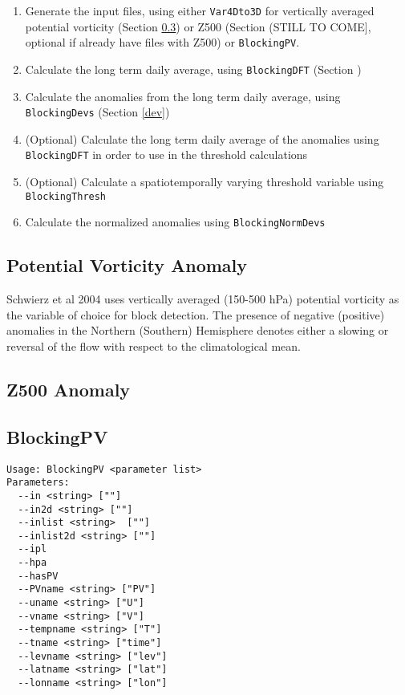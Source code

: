 \documentclass{article}
\begin{document}
\begin{enumerate}
\item Generate the input files, using either \texttt{Var4Dto3D} for vertically averaged potential vorticity (Section \ref{PV}) or Z500 (Section (STILL TO COME], optional if already have files with Z500) or \texttt{BlockingPV}.
\item Calculate the long term daily average, using \texttt{BlockingDFT} (Section )
\item Calculate the anomalies from the long term daily average, using \texttt{BlockingDevs} (Section \ref{dev})
\item (Optional) Calculate the long term daily average of the anomalies using \texttt{BlockingDFT} in order to use in the threshold calculations
\item (Optional) Calculate a spatiotemporally varying threshold variable using \texttt{BlockingThresh}
\item Calculate the normalized anomalies using \texttt{BlockingNormDevs}
\end{enumerate}

\subsection{Potential Vorticity Anomaly}

Schwierz et al 2004 uses vertically averaged (150-500 hPa) potential vorticity as the variable of choice for block detection. The presence of negative (positive) anomalies in the Northern (Southern) Hemisphere denotes either a slowing or reversal of the flow with respect to the climatological mean. 

\subsection{Z500 Anomaly}

\subsection{BlockingPV}\label{PV}
\begin{verbatim}
Usage: BlockingPV <parameter list>
Parameters:
  --in <string> [""]
  --in2d <string> [""]
  --inlist <string>  [""]
  --inlist2d <string> [""]
  --ipl
  --hpa
  --hasPV
  --PVname <string> ["PV"]
  --uname <string> ["U"]
  --vname <string> ["V"]
  --tempname <string> ["T"]
  --tname <string> ["time"]
  --levname <string> ["lev"]
  --latname <string> ["lat"]
  --lonname <string> ["lon"]
\end{verbatim}
\end{document}
